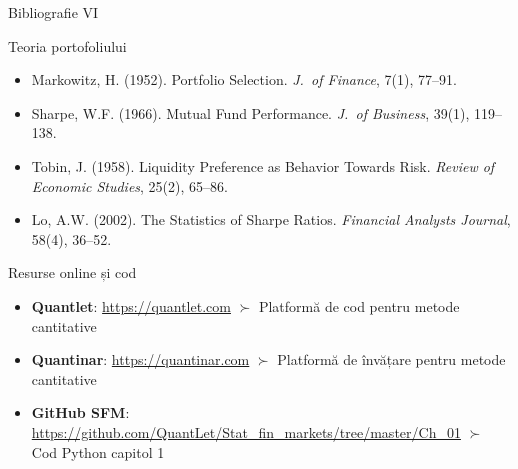 \documentclass[9pt, aspectratio=169, t]{beamer}
\theoremstyle{definition}
\newenvironment{cminipage}[1]{%
    \par\noindent\hfill\begin{minipage}{#1}\ignorespaces
}{%
    \end{minipage}\hfill\null\par
}
\begin{document}
\begin{frame}{Bibliografie VI}
    \begin{cminipage}{0.95\textwidth}
    \begin{block}{Teoria portofoliului}
        {\small
        \begin{itemize}\setlength{\itemsep}{0pt}
            \item Markowitz, H. (1952). Portfolio Selection. \textit{J.\ of Finance}, 7(1), 77--91.
            \item Sharpe, W.F. (1966). Mutual Fund Performance. \textit{J.\ of Business}, 39(1), 119--138.
            \item Tobin, J. (1958). Liquidity Preference as Behavior Towards Risk. \textit{Review of Economic Studies}, 25(2), 65--86.
            \item Lo, A.W. (2002). The Statistics of Sharpe Ratios. \textit{Financial Analysts Journal}, 58(4), 36--52.
        \end{itemize}
        }
    \end{block}

    \begin{exampleblock}{Resurse online și cod}
        {\small
        \begin{itemize}\setlength{\itemsep}{0pt}
            \item \textbf{Quantlet}: \url{https://quantlet.com} $\succ$ Platformă de cod pentru metode cantitative
            \item \textbf{Quantinar}: \url{https://quantinar.com} $\succ$ Platformă de învățare pentru metode cantitative
            \item \textbf{GitHub SFM}: \url{https://github.com/QuantLet/Stat_fin_markets/tree/master/Ch_01} $\succ$ Cod Python capitol 1
        \end{itemize}
        }
    \end{exampleblock}
    \end{cminipage}
\end{frame}
\end{document}
